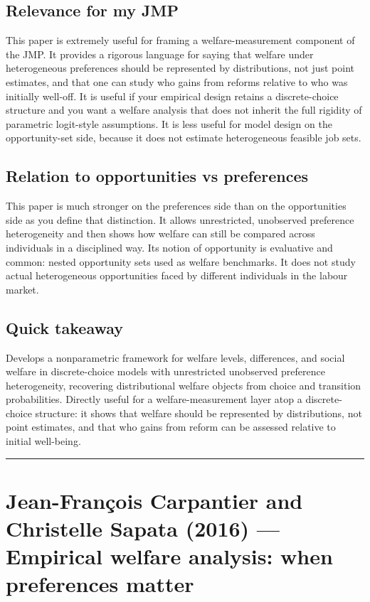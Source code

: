 \documentclass[11pt,a4paper]{article}
\begin{document}
\subsection*{Relevance for my JMP}
This paper is extremely useful for framing a welfare-measurement component of the JMP. It provides a rigorous language for saying that welfare under heterogeneous preferences should be represented by distributions, not just point estimates, and that one can study who gains from reforms relative to who was initially well-off. It is useful if your empirical design retains a discrete-choice structure and you want a welfare analysis that does not inherit the full rigidity of parametric logit-style assumptions. It is less useful for model design on the opportunity-set side, because it does not estimate heterogeneous feasible job sets.

\subsection*{Relation to opportunities vs preferences}
This paper is much stronger on the preferences side than on the opportunities side as you define that distinction. It allows unrestricted, unobserved preference heterogeneity and then shows how welfare can still be compared across individuals in a disciplined way. Its notion of opportunity is evaluative and common: nested opportunity sets used as welfare benchmarks. It does not study actual heterogeneous opportunities faced by different individuals in the labour market.

\subsection*{Quick takeaway}
Develops a nonparametric framework for welfare levels, differences, and social welfare in discrete-choice models with unrestricted unobserved preference heterogeneity, recovering distributional welfare objects from choice and transition probabilities. Directly useful for a welfare-measurement layer atop a discrete-choice structure: it shows that welfare should be represented by distributions, not point estimates, and that who gains from reform can be assessed relative to initial well-being.


\medskip\hrule\medskip

\section*{Jean-François Carpantier and Christelle Sapata (2016) — Empirical welfare analysis: when preferences matter}
\end{document}
